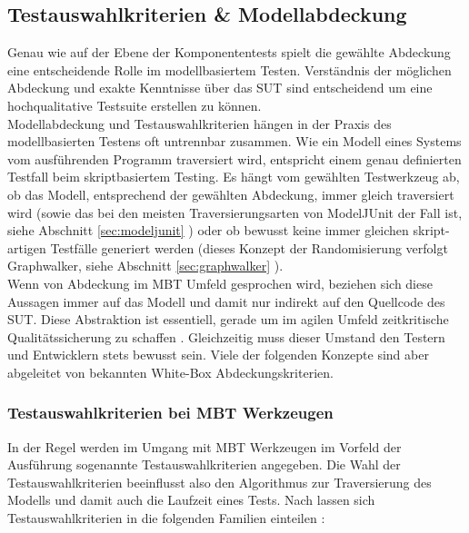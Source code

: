 \subsection{Testauswahlkriterien \& Modellabdeckung}
\label{sec:coverage}

Genau wie auf der Ebene der Komponententests spielt die gewählte Abdeckung eine entscheidende Rolle im modellbasiertem Testen. Verständnis der möglichen Abdeckung und exakte Kenntnisse über das \Gls{SUT} sind entscheidend um eine hochqualitative Testsuite erstellen zu können.\\
Modellabdeckung und Testauswahlkriterien hängen in der Praxis des modellbasierten Testens oft untrennbar zusammen. Wie ein Modell eines Systems vom ausführenden Programm traversiert wird, entspricht einem genau definierten Testfall beim skriptbasiertem Testing. Es hängt vom gewählten Testwerkzeug ab, ob das Modell, entsprechend der gewählten Abdeckung, immer gleich traversiert wird (sowie das bei den meisten Traversierungsarten von ModelJUnit der Fall ist, siehe Abschnitt \ref{sec:modeljunit} ) oder ob bewusst keine immer gleichen skript-artigen Testfälle generiert werden (dieses Konzept der Randomisierung verfolgt Graphwalker, siehe Abschnitt \ref{sec:graphwalker} ).\\
Wenn von Abdeckung im \Gls{MBT} Umfeld gesprochen wird, beziehen sich diese Aussagen immer auf das Modell und damit nur indirekt auf den Quellcode des \Gls{SUT}. Diese Abstraktion ist essentiell, gerade um im agilen Umfeld zeitkritische Qualitätssicherung zu schaffen \cite{utting_practical_2007}. Gleichzeitig muss dieser Umstand den Testern und Entwicklern stets bewusst sein. Viele der folgenden Konzepte sind aber abgeleitet von bekannten White-Box Abdeckungskriterien.

\subsubsection{Testauswahlkriterien bei \Gls{MBT} Werkzeugen}
In der Regel werden im Umgang mit MBT Werkzeugen im Vorfeld der Ausführung sogenannte Testauswahlkriterien angegeben. Die Wahl der Testauswahlkriterien beeinflusst also den Algorithmus zur Traversierung des Modells und damit auch die Laufzeit eines Tests. Nach \citeauthor{utting_practical_2007} lassen sich Testauswahlkriterien in die folgenden Familien einteilen \cite{utting_practical_2007}:

